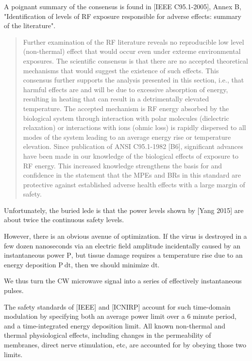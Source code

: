 \documentclass[fleqn,10pt]{article}
\begin{document}
A poignant summary of the consensus is found in [IEEE C95.1-2005], Annex B, "Identification of levels of RF exposure responsible for adverse effects: summary of the literature".

\begin{quote}
Further examination of the RF literature reveals no reproducible low level (non-thermal) effect that would
occur even under extreme environmental exposures. The scientific consensus is that there are no accepted
theoretical mechanisms that would suggest the existence of such effects. This consensus further supports the
analysis presented in this section, i.e., that harmful effects are and will be due to excessive absorption of
energy, resulting in heating that can result in a detrimentally elevated temperature. The accepted mechanism
is RF energy absorbed by the biological system through interaction with polar molecules (dielectric relaxation) or interactions with ions (ohmic loss) is rapidly dispersed to all modes of the system leading to an
average energy rise or temperature elevation. Since publication of ANSI C95.1-1982 [B6], significant
advances have been made in our knowledge of the biological effects of exposure to RF energy. This
increased knowledge strengthens the basis for and confidence in the statement that the MPEs and BRs in this
standard are protective against established adverse health effects with a large margin of safety.

\end{quote}

Unfortunately, the buried lede is that the power levels shown by [Yang 2015] are about twice the continuous safety levels. 

However, there is an obvious avenue of optimization. If the virus is destroyed in a few dozen nanoseconds via an electric field amplitude incidentally caused by an instantaneous power $\text{P}$, but tissue damage requires a temperature rise due to an energy deposition $\text{P} \  \text{dt}$, then we should minimize dt.\

We thus turn the CW microwave signal into a series of effectively instantaneous pulses.

The safety standards of [IEEE] and [ICNIRP] account for such time-domain modulation by specifying both an average power limit over a 6 minute period, and a time-integrated energy deposition limit. All known non-thermal and thermal physiological effects, including changes in the permeability of membranes, direct nerve stimulation, etc, are accounted for by obeying those two limits.
\end{document}
